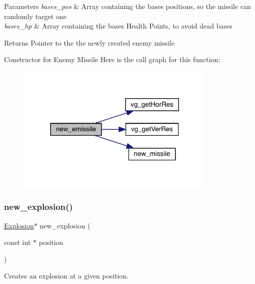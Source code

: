 \begin{DoxyParams}{Parameters}
{\em bases\+\_\+pos} & Array containing the bases\textquotesingle{} positions, so the missile can randomly target one \\
\hline
{\em bases\+\_\+hp} & Array containing the bases\textquotesingle{} Health Points, to avoid dead bases\\
\hline
\end{DoxyParams}
\begin{DoxyReturn}{Returns}
Pointer to the the newly created enemy missile
\end{DoxyReturn}
Constructor for Enemy Missile Here is the call graph for this function\+:\nopagebreak
\begin{figure}[H]
\begin{center}
\leavevmode
\includegraphics[width=272pt]{group___missile_ga6a34d606d98bc4ce9643a20ba65fd472_cgraph}
\end{center}
\end{figure}
\hypertarget{group___missile_ga26a5cb6dc4144b31bb2005e4b587ff4f}{}\label{group___missile_ga26a5cb6dc4144b31bb2005e4b587ff4f} 
\subsubsection{\texorpdfstring{new\+\_\+explosion()}{new\_explosion()}}
{\footnotesize\ttfamily \hyperlink{group___missile_gab15157e0eccd9297f66644015d4966b1}{Explosion}$\ast$ new\+\_\+explosion (\begin{DoxyParamCaption}\item[{const int $\ast$}]{position }\end{DoxyParamCaption})}



Creates an explosion at a given position. 


